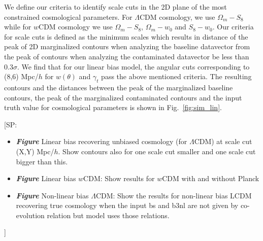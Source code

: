 \documentclass[fleqn,usenatbib]{mnras}
\newcommand{\SP}[1]{{\color{brown}[SP: #1]}}
\begin{document}
We define our criteria to identify  scale cuts in the 2D plane of the most constrained cosmological parameters. For $\Lambda$CDM cosmology, we use $\Omega_m - S_8$ while for $w$CDM cosmology we use $\Omega_m-S_8$, $\Omega_m-w_0$ and $S_8-w_0$. Our criteria for scale cuts is defined as the minimum scales which results in distance of the peak of 2D marginalized contours when analyzing the baseline datavector from the peak of contours when analyzing the contaminated datavector be less than 0.3$\sigma$. We find that for our linear bias model, the angular cuts corresponding to (8,6) Mpc/$h$ for $w(\theta)$ and $\gamma_t$ pass the above mentioned criteria. The resulting contours and the distances between the peak of the marginalized baseline contours, the peak of the marginalized contaminated contours and the input truth value for cosmological parameters is shown in Fig.~\ref{fig:sim_lin}. 

\SP{\begin{itemize}
    \item \textbf{\textit{Figure}} Linear bias recovering unbiased cosmology (for $\Lambda$CDM) at scale cut (X,Y) Mpc/$h$. Show contours also for one scale cut smaller and one scale cut bigger than this. 
    \item \textbf{\textit{Figure}} Linear bias $w$CDM: Show results for $w$CDM with and without Planck
    \item \textbf{\textit{Figure}} Non-linear bias $\Lambda$CDM: Show the results for non-linear bias LCDM recovering true cosmology when the input bs and b3nl are not given by co-evolution relation but model uses those relations.
\end{itemize}
}
\end{document}
